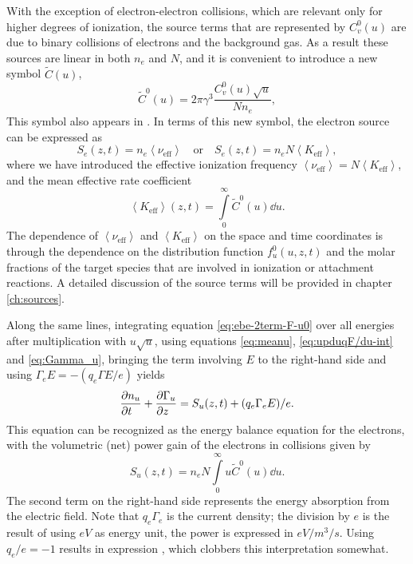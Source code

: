 \documentclass{book}
\newcommand{\MEAN}[1]{\ensuremath{\!\left\langle{{#1}}\right\rangle}}
\begin{document}
With the exception of electron-electron collisions, which are relevant only for
higher degrees of ionization, the source terms that are represented by $C_v^0(u)$
are due to binary collisions of electrons and the background gas. As a result
these sources are linear in both $n_e$ and $N$, and it is convenient to
introduce a new symbol
$\tilde{C}(u)$,
\begin{equation}
	\tilde{C}^0(u) = 2\pi\gamma^3\frac{C_v^0(u)\sqrt{u}}{Nn_e},
	\label{eq:Ctilde0}
\end{equation}
This symbol also appears in \cite[eq. 14]{Hagelaar2005}.
In terms of this new symbol, the electron source can be expressed as
\begin{equation}
	S_e(z,t) = n_e\MEAN{\nu_{\text{eff}}}
	\quad\text{or}\quad
	S_e(z,t) = n_eN\MEAN{K_{\text{eff}}},
	\label{eq:S_e}
\end{equation}
where we have introduced the effective ionization frequency
$\MEAN{\nu_{\text{eff}}}=N\MEAN{K_{\text{eff}}}$, and the mean effective rate coefficient
\begin{equation}
	\MEAN{K_{\text{eff}}}(z,t)
	= \int\limits_0^\infty\tilde{C}^0(u)\dd{u}.
	\label{eq:K_eff}
\end{equation}
The dependence of $\MEAN{\nu_{\text{eff}}}$ and $\MEAN{K_{\text{eff}}}$ on the space and time
coordinates is through the dependence on the distribution function
$f^0_u(u,z,t)$ and the molar fractions of the target species that are
involved in ionization or attachment reactions. A detailed discussion of
the source terms will be provided in chapter \ref{ch:sources}.

Along the same lines, integrating equation \eqref{eq:ebe-2term-F-u0} over all
energies after multiplication
with $u\sqrt{u}$, using equations \eqref{eq:meanu}, \eqref{eq:upduqF/du-int} and
\eqref{eq:Gamma_u}, bringing the term involving $E$ to the right-hand side
and using $\Gamma_eE = -(q_e\Gamma E/e)$ yields
\begin{equation}
	\PDEV{n_u}{t} + \PDEV{\Gamma_u}{z}
	= S_u(z,t) + (q_e\Gamma_eE)/e.
	\label{eq:energy-balance}
\end{equation}
This equation can be recognized as the energy balance equation for the
electrons, with the volumetric (net) power gain of the electrons
in collisions given by
\begin{equation}
	S_u(z,t)
	= n_eN\int\limits_0^\infty u\tilde{C}^0(u)\dd{u}.
	\label{eq:S_u}
\end{equation}
The second term on the right-hand side represents the energy absorption
from the electric field. Note that $q_e\Gamma_e$ is the current density;
the division by $e$ is the result of using $\si{eV}$ as energy unit, the
power is expressed in $\si{eV/m^3/s}$.
Using $q_e/e=-1$ results in expression \cite[eq. 57]{Hagelaar2005},
which clobbers this interpretation somewhat.
\end{document}
